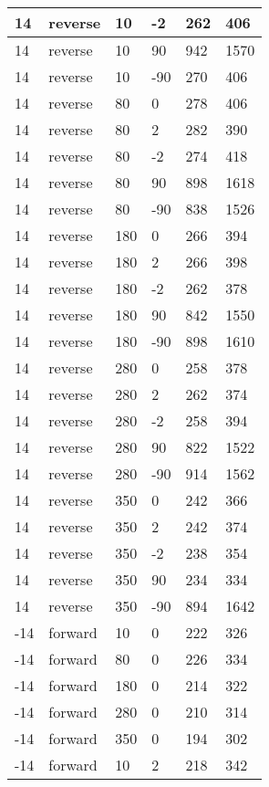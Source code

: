 \begin{longtable}{|l|l|l|l|l|l|}
			\hline
			14 & reverse & 10 & -2 & 262 & 406 \\
			\hline
			14 & reverse & 10 & 90 & 942 & 1570 \\
			\hline
			14 & reverse & 10 & -90 & 270 & 406 \\
			\hline
			14 & reverse & 80 & 0 & 278 & 406 \\
			\hline
			14 & reverse & 80 & 2 & 282 & 390 \\
			\hline
			14 & reverse & 80 & -2 & 274 & 418 \\
			\hline
			14 & reverse & 80 & 90 & 898 & 1618 \\
			\hline
			14 & reverse & 80 & -90 & 838 & 1526 \\
			\hline
			14 & reverse & 180 & 0 & 266 & 394 \\
			\hline
			14 & reverse & 180 & 2 & 266 & 398 \\
			\hline
			14 & reverse & 180 & -2 & 262 & 378 \\
			\hline
			14 & reverse & 180 & 90 & 842 & 1550 \\
			\hline
			14 & reverse & 180 & -90 & 898 & 1610 \\
			\hline
			14 & reverse & 280 & 0 & 258 & 378 \\
			\hline
			14 & reverse & 280 & 2 & 262 & 374 \\
			\hline
			14 & reverse & 280 & -2 & 258 & 394 \\
			\hline
			14 & reverse & 280 & 90 & 822 & 1522 \\
			\hline
			14 & reverse & 280 & -90 & 914 & 1562 \\
			\hline
			14 & reverse & 350 & 0 & 242 & 366 \\
			\hline
			14 & reverse & 350 & 2 & 242 & 374 \\
			\hline
			14 & reverse & 350 & -2 & 238 & 354 \\
			\hline
			14 & reverse & 350 & 90 & 234 & 334 \\
			\hline
			14 & reverse & 350 & -90 & 894 & 1642 \\
			\hline
			-14 & forward & 10 & 0 & 222 & 326 \\
			\hline
			-14 & forward & 80 & 0 & 226 & 334 \\
			\hline
			-14 & forward & 180 & 0 & 214 & 322 \\
			\hline
			-14 & forward & 280 & 0 & 210 & 314 \\
			\hline
			-14 & forward & 350 & 0 & 194 & 302 \\
			\hline
			-14 & forward & 10 & 2 & 218 & 342 \\

\end{longtable}
